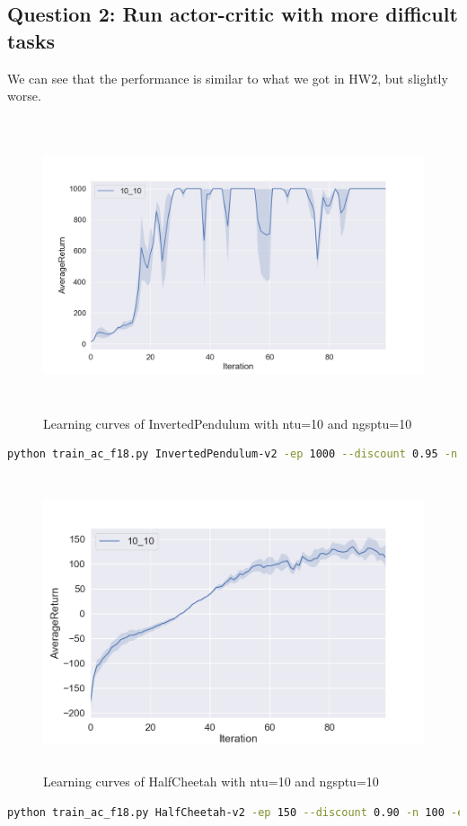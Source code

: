 \documentclass[12pt]{article}
\begin{document}
\subsection*{Question 2: Run actor-critic with more difficult tasks}
We can see that the performance is similar to what we got in HW2, but slightly worse.
\begin{figure}[H]
  \centering
  \includegraphics[height=3.4in]{part2_q2_2.png}
  \caption{Learning curves of InvertedPendulum with ntu=10 and ngsptu=10}
\end{figure}
\begin{lstlisting}[language=bash]
python train_ac_f18.py InvertedPendulum-v2 -ep 1000 --discount 0.95 -n 100 -e 3 -l 2 -s 64 -b 5000 -lr 0.01 -clr 0.01 --exp_name 10_10 -ntu 10 -ngsptu 10
\end{lstlisting}
\begin{figure}[H]
  \centering
  \includegraphics[height=3.4in]{part2_q2_1.png}
  \caption{Learning curves of HalfCheetah with ntu=10 and ngsptu=10}
\end{figure}
\begin{lstlisting}[language=bash]
python train_ac_f18.py HalfCheetah-v2 -ep 150 --discount 0.90 -n 100 -e 3 -l 2 -s 32 -b 30000 -lr 0.02 -clr 0.02 --exp_name 10_10 -ntu 10 -ngsptu 10
\end{lstlisting}
\end{document}
